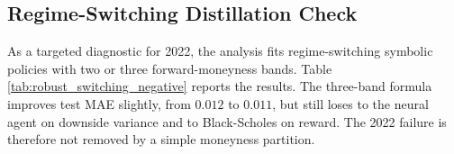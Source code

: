 \documentclass[a4paper,12pt]{article}
\numberwithin{equation}{section}
\begin{document}
\subsection{Regime-Switching Distillation Check}
\label{sec:appendix_regime_switching}

As a targeted diagnostic for 2022, the analysis fits regime-switching symbolic policies with two or three forward-moneyness bands. Table \ref{tab:robust_switching_negative} reports the results. The three-band formula improves test MAE slightly, from $0.012$ to $0.011$, but still loses to the neural agent on downside variance and to Black-Scholes on reward. The 2022 failure is therefore not removed by a simple moneyness partition.

\begin{table}[H]
    \centering
    \caption{Moneyness regime-switching check for 2022.}
    \label{tab:robust_switching_negative}
    \resizebox{0.78\textwidth}{!}{}
\end{table}
\end{document}

